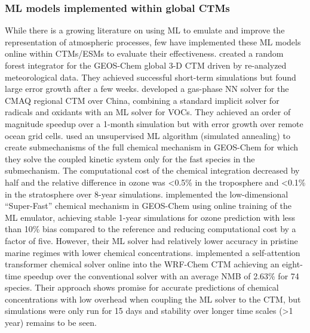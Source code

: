 \documentclass[gmd, manuscript]{copernicus}
\begin{document}
\subsubsection{ML models implemented within global CTMs}
While there is a growing literature on using ML to emulate and improve the representation of atmospheric processes, few have implemented these ML models online within CTMs/ESMs to evaluate their effectiveness. \citet{keller_application_2019} created a random forest integrator for the GEOS-Chem global 3-D CTM driven by re-analyzed meteorological data. They achieved successful short-term simulations but found large error growth after a few weeks. \citet{liu_correcting_2022} developed a gas-phase NN solver for the CMAQ regional CTM over China, combining a standard implicit solver for radicals and oxidants with an ML solver for VOCs. They achieved an order of magnitude speedup over a 1-month simulation but with error growth over remote ocean grid cells. \citet{shen_machine-learning-guided_2022} used an unsupervised ML algorithm (simulated annealing) to create submechanisms of the full chemical mechanism in GEOS-Chem for which they solve the coupled kinetic system only for the fast species in the submechanism. The computational cost of the chemical integration decreased by half and the relative difference in ozone was <0.5\% in the troposphere and <0.1\% in the stratosphere over 8-year simulations. \citet{kelp_online-learned_nodate} implemented the low-dimensional “Super-Fast” chemical mechanism in GEOS-Chem using online training of the ML emulator, achieving stable 1-year simulations for ozone prediction with less than 10\% bias compared to the reference and reducing computational cost by a factor of five. However, their ML solver had relatively lower accuracy in pristine marine regimes with lower chemical concentrations. \citet{xia_advancing_2024} implemented a self-attention transformer chemical solver online into the WRF-Chem CTM achieving an eight-time speedup over the conventional solver with an average NMB of 2.63\% for 74 species. Their approach shows promise for accurate predictions of chemical concentrations with low overhead when coupling the ML solver to the CTM, but simulations were only run for 15 days and stability over longer time scales (>1 year) remains to be seen. 
\end{document}
